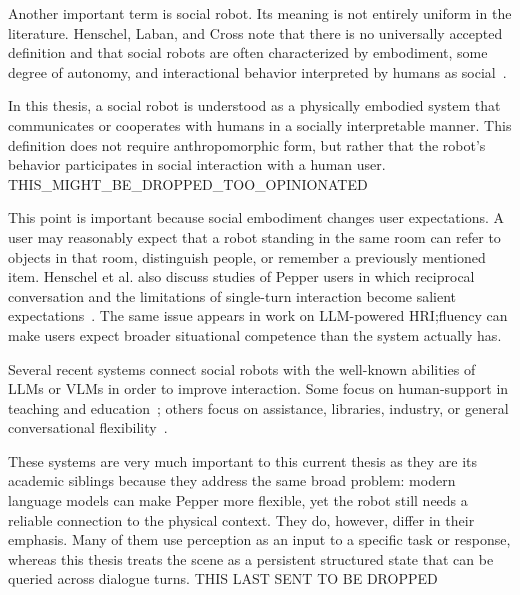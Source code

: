 Another important term is social robot. Its meaning is not entirely uniform in the literature. Henschel, Laban, and Cross note that there is no universally accepted definition and that social robots are often characterized by embodiment, some degree of autonomy, and interactional behavior interpreted by humans as social~\cite[11--12]{henschel_what_2021}.

In this thesis, a social robot is understood as a physically embodied system that communicates or cooperates with humans in a socially interpretable manner. This definition does not require anthropomorphic form, but rather that the robot's behavior participates in social interaction with a human user. THIS\_MIGHT\_BE\_DROPPED\_TOO\_OPINIONATED

This point is important because social embodiment changes user expectations. A user may reasonably expect that a robot standing in the same room can refer to objects in that room, distinguish people, or remember a previously mentioned item. Henschel et al. also discuss studies of Pepper users in which reciprocal conversation and the limitations of single-turn interaction become salient expectations~\cite[12]{henschel_what_2021}. The same issue appears in work on LLM-powered HRI;\@Language fluency can make users expect broader situational competence than the system actually has\@\cite{kim_understanding_2024,atuhurra_leveraging_2024}.

Several recent systems connect social robots with the well-known abilities of LLMs or VLMs in order to improve interaction. Some focus on human-support in teaching and education~\cite{latif_physicsassistant_2024,sievers_humanoid_2025}; others focus on assistance, libraries, industry, or general conversational flexibility~\cite{trinquet_future_2025,brad_retrieval-augmented_2025,becerra_improving_2024}.

These systems are very much important to this current thesis as they are its academic siblings because they address the same broad problem: modern language models can make Pepper more flexible, yet the robot still needs a reliable connection to the physical context. They do, however, differ in their emphasis. Many of them use perception as an input to a specific task or response, whereas this thesis treats the scene as a persistent structured state that can be queried across dialogue turns. THIS LAST SENT TO BE DROPPED

